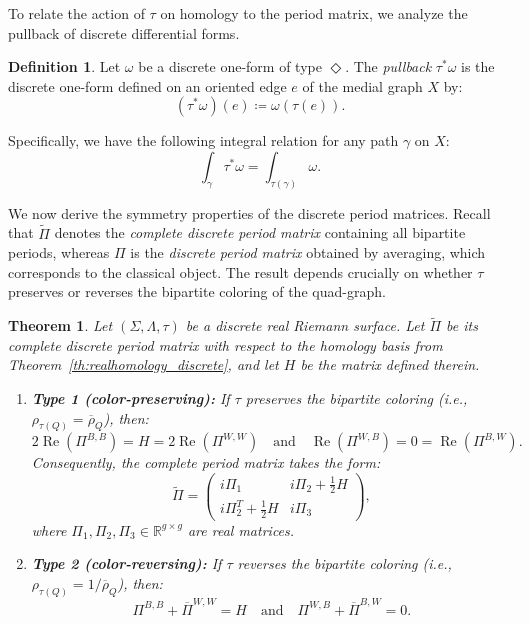 \documentclass[11pt,a4paper]{article}
\newtheorem{theorem}{Theorem}[section]
\theoremstyle{definition}
\newtheorem*{definition}{Definition}
\newcommand{\R}{\mathds{R}}
\renewcommand{\Re}{\operatorname{Re}}
\begin{document}
To relate the action of $\tau$ on homology to the period matrix, we analyze the pullback of discrete differential forms.

\begin{definition}
	Let $\omega$ be a discrete one-form of type $\Diamond$. The \textit{pullback} $\tau^*\omega$ is the discrete one-form defined on an oriented edge $e$ of the medial graph $X$ by:
	\[ (\tau^*\omega)(e) \coloneq \omega(\tau(e)). \]
\end{definition}

Specifically, we have the following integral relation for any path $\gamma$ on $X$:
\begin{equation}\label{eq:integral}
	\int_{\gamma} \tau^*\omega = \int_{\tau(\gamma)} \omega.
\end{equation}

We now derive the symmetry properties of the discrete period matrices.
Recall that $\tilde{\Pi}$ denotes the \emph{complete discrete period matrix} containing all bipartite periods, whereas $\Pi$ is the \emph{discrete period matrix} obtained by averaging, which corresponds to the classical object.
The result depends crucially on whether $\tau$ preserves or reverses the bipartite coloring of the quad-graph.

\begin{theorem} \label{th:completeperiodmatrix}
	Let $(\Sigma, \Lambda, \tau)$ be a discrete real Riemann surface. Let $\tilde{\Pi}$ be its complete discrete period matrix with respect to the homology basis from Theorem~\ref{th:realhomology_discrete}, and let $H$ be the matrix defined therein.
	\begin{enumerate}
		\item[(i)] \textbf{Type 1 (color-preserving):} If $\tau$ preserves the bipartite coloring (i.e., $\rho_{\tau(Q)} = \overline{\rho}_{Q}$), then:
		\[ 2 \Re(\Pi^{B,B}) = H = 2 \Re(\Pi^{W,W}) \quad \text{and} \quad \Re(\Pi^{W,B}) = 0 = \Re(\Pi^{B,W}). \]
		Consequently, the complete period matrix takes the form:
		\[ \tilde{\Pi} = \begin{pmatrix}
			i \Pi_1 & i \Pi_2 + \frac{1}{2} H \\
			i \Pi_2^T + \frac{1}{2} H & i \Pi_3
		\end{pmatrix}, \]
		where $\Pi_1, \Pi_2, \Pi_3 \in \R^{g \times g}$ are real matrices.
		\item[(ii)] \textbf{Type 2 (color-reversing):} If $\tau$ reverses the bipartite coloring (i.e., $\rho_{\tau(Q)} = 1/\overline{\rho}_{Q}$), then:
		\[ \Pi^{B,B} + \overline{\Pi}^{W,W} = H \quad \text{and} \quad \Pi^{W,B} + \overline{\Pi}^{B,W} = 0. \]
	\end{enumerate}
\end{theorem}
\end{document}
